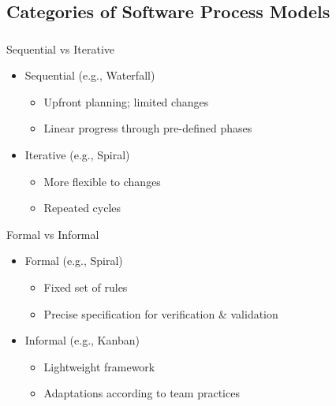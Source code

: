 \subsection{Categories of Software Process Models}
\begin{frame}
	\frametitle{\insertsubsection{}}

	\begin{fancycolumns}[t]
		\begin{note}{Sequential vs Iterative}
			\begin{itemize}
				\item Sequential (e.g., Waterfall)
				      \begin{itemize}
					      \item Upfront planning; limited changes
					      \item Linear progress through pre-defined phases
				      \end{itemize}
				\item Iterative (e.g., Spiral)
				      \begin{itemize}
					      \item More flexible to changes
					      \item Repeated cycles
				      \end{itemize}
			\end{itemize}
		\end{note}
		\nextcolumn
		\begin{note}{Formal vs Informal}
			\begin{itemize}
				\item Formal (e.g., Spiral)
				      \begin{itemize}
					      \item Fixed set of rules
					      \item Precise specification for verification \& validation
				      \end{itemize}
				\item Informal (e.g., Kanban)
				      \begin{itemize}
					      \item Lightweight framework
					      \item Adaptations according to team practices
				      \end{itemize}
			\end{itemize}
		\end{note}

	\end{fancycolumns}


\end{frame}

